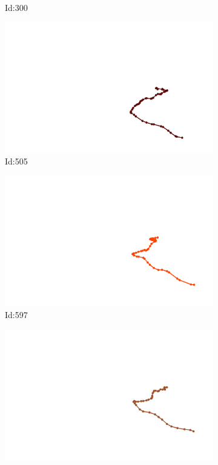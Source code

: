 \documentclass[12pt,twoside]{report}
\begin{document}
\begin{figure}
\begin{subfigure}[b]{0.20\textwidth}
\caption{Id:300}
\end{subfigure}
\begin{subfigure}[b]{0.20\textwidth}
\centering
\includegraphics[width=\textwidth]{../../trajectories/505.png}
\caption{Id:505}
\end{subfigure}
\begin{subfigure}[b]{0.20\textwidth}
\centering
\includegraphics[width=\textwidth]{../../trajectories/597.png}
\caption{Id:597}
\end{subfigure}
\begin{subfigure}[b]{0.20\textwidth}
\centering
\includegraphics[width=\textwidth]{../../trajectories/642.png}

\end{subfigure}
\end{figure}
\end{document}
